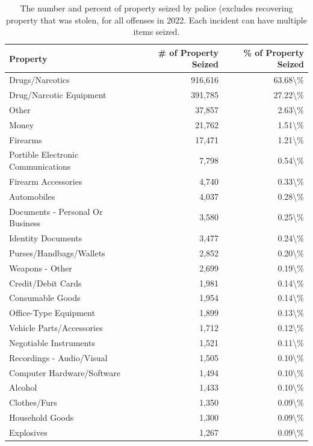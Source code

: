 \documentclass[
  12pt,
  openany]{book}
\begin{document}
\begin{longtable}[t]{lrr}
\caption{\label{tab:propertySeizedDescription}The number and percent of property seized by police (excludes recovering property that was stolen, for all offenses in 2022. Each incident can have multiple items seized.}\\
\toprule
Property & \# of Property Seized & \% of Property Seized\\
\midrule
Drugs/Narcotics & 916,616 & 63.68\textbackslash{}\%\\
Drug/Narcotic Equipment & 391,785 & 27.22\textbackslash{}\%\\
Other & 37,857 & 2.63\textbackslash{}\%\\
Money & 21,762 & 1.51\textbackslash{}\%\\
Firearms & 17,471 & 1.21\textbackslash{}\%\\
\addlinespace
Portible Electronic Communications & 7,798 & 0.54\textbackslash{}\%\\
Firearm Accessories & 4,740 & 0.33\textbackslash{}\%\\
Automobiles & 4,037 & 0.28\textbackslash{}\%\\
Documents - Personal Or Business & 3,580 & 0.25\textbackslash{}\%\\
Identity Documents & 3,477 & 0.24\textbackslash{}\%\\
\addlinespace
Purses/Handbags/Wallets & 2,852 & 0.20\textbackslash{}\%\\
Weapons - Other & 2,699 & 0.19\textbackslash{}\%\\
Credit/Debit Cards & 1,981 & 0.14\textbackslash{}\%\\
Consumable Goods & 1,954 & 0.14\textbackslash{}\%\\
Office-Type Equipment & 1,899 & 0.13\textbackslash{}\%\\
\addlinespace
Vehicle Parts/Accessories & 1,712 & 0.12\textbackslash{}\%\\
Negotiable Instruments & 1,521 & 0.11\textbackslash{}\%\\
Recordings - Audio/Visual & 1,505 & 0.10\textbackslash{}\%\\
Computer Hardware/Software & 1,494 & 0.10\textbackslash{}\%\\
Alcohol & 1,433 & 0.10\textbackslash{}\%\\
\addlinespace
Clothes/Furs & 1,350 & 0.09\textbackslash{}\%\\
Household Goods & 1,300 & 0.09\textbackslash{}\%\\
Explosives & 1,267 & 0.09\textbackslash{}\%\\

\end{longtable}
\end{document}
